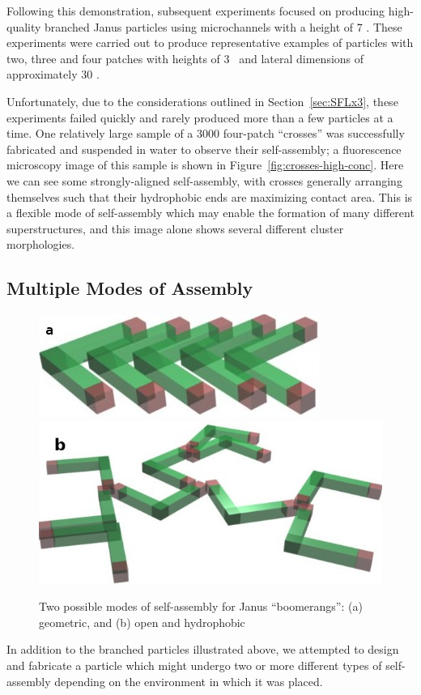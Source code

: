 Following this demonstration, subsequent experiments focused on producing high-quality 
branched Janus particles using microchannels with a height of 7 \microns.  These experiments were carried
out to produce representative 
examples of particles with two, three and four patches with heights of
3 \microns~and lateral dimensions of approximately 30 \microns.  

Unfortunately, due to the considerations
outlined in Section~\ref{sec:SFLx3}, these experiments failed quickly and rarely produced more than a few
particles at a time.  One relatively large sample of a 3000 four-patch ``crosses'' was successfully fabricated 
and suspended in water to observe their self-assembly; a fluorescence 
microscopy image of this sample is shown in Figure~\ref{fig:crosses-high-conc}.  Here we can see 
some strongly-aligned self-assembly, with crosses generally arranging themselves such that
their hydrophobic ends are maximizing contact area.  This is a flexible mode of self-assembly 
which may enable the formation of many different superstructures, and this image alone shows several different
cluster morphologies.

\subsection{Multiple Modes of Assembly}

\begin{figure}[h]
\begin{center}
\includegraphics[width=0.4\linewidth]{figures/complex-shapes/boomerangs-dense-assembly.jpg} \hfill \includegraphics[width=0.4\linewidth]{figures/complex-shapes/boomerangs-open-assembly.jpg}
\end{center}
\caption{Two possible modes of self-assembly for Janus ``boomerangs'': (a) geometric, and (b) open and hydrophobic}
\label{fig:boomerang-assembly}
\end{figure}

In addition to the branched particles illustrated above, we attempted to design and fabricate 
a particle which might undergo two or more different types of self-assembly depending on the environment
in which it was placed.  

